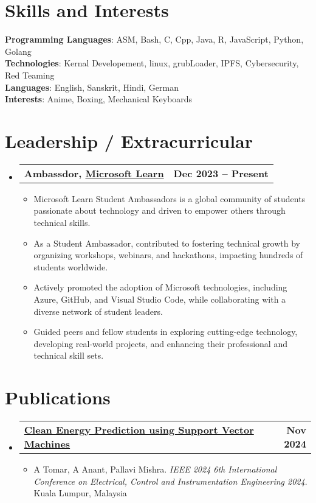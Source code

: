 \documentclass[a4paper,11pt]{article}
\makeatletter
\newcommand{\resumeItem}[1]{
  \item\small{
    {#1 \vspace{-2pt}}
  }
}
\newcommand{\resumeSubheadingg}[2]{
  \vspace{-2pt}\item
    \begin{tabular*}{1.0\textwidth}[t]{l@{\extracolsep{\fill}}r}
      \textbf{#1} & \textbf{\small #2} \\
    \end{tabular*}\vspace{-7pt}
}
\newcommand{\resumeSubHeadingListStart}{\begin{itemize}[leftmargin=0.0in, label={}]}
\newcommand{\resumeSubHeadingListEnd}{\end{itemize}}
\newcommand{\resumeItemListStart}{\begin{itemize}}
\newcommand{\resumeItemListEnd}{\end{itemize}\vspace{-5pt}}
\makeatother
\begin{document}
%
\section{Skills and Interests}
 \begin{itemize}[leftmargin=0.15in, label={}]
    \small{\item{
     \textbf{Programming Languages}{: ASM, Bash, C, Cpp, Java, R, JavaScript, Python, Golang} \\
     \textbf{Technologies}{: Kernal Developement, linux, grubLoader, IPFS, Cybersecurity, Red Teaming} \\
     \textbf{Languages}{: English, Sanskrit, Hindi, German} \\
     \textbf{Interests}{: Anime, Boxing, Mechanical Keyboards} \\
    }}
 \end{itemize}
 \vspace{-16pt}

\section{Leadership / Extracurricular}
    \resumeSubHeadingListStart
        \resumeSubheadingg{{Ambassdor, \href{https://mvp.microsoft.com/}{Microsoft Learn}}}{Dec 2023 -- Present}
            \resumeItemListStart
                \resumeItem{Microsoft Learn Student Ambassadors is a global community of students passionate about technology and driven to empower others through technical skills.}  
\resumeItem{As a Student Ambassador, contributed to fostering technical growth by organizing workshops, webinars, and hackathons, impacting hundreds of students worldwide.}  
\resumeItem{Actively promoted the adoption of Microsoft technologies, including Azure, GitHub, and Visual Studio Code, while collaborating with a diverse network of student leaders.}  
\resumeItem{Guided peers and fellow students in exploring cutting-edge technology, developing real-world projects, and enhancing their professional and technical skill sets.}

            \resumeItemListEnd
    \resumeSubHeadingListEnd
    
\section{Publications}
  \resumeSubHeadingListStart
    \resumeSubheadingg
      {\href{https://www.researchgate.net/publication/385891164_Clean_Energy_Prediction_Using_Support_Vector_Machines}{Clean Energy Prediction using Support Vector Machines}}{Nov 2024}
      \resumeItemListStart
        \resumeItem{A Tomar, A Anant, Pallavi Mishra. \textit{IEEE 2024 6th International Conference on Electrical, Control and Instrumentation Engineering 2024}. Kuala Lumpur, Malaysia}
    \resumeItemListEnd
  \resumeSubHeadingListEnd
\end{document}

